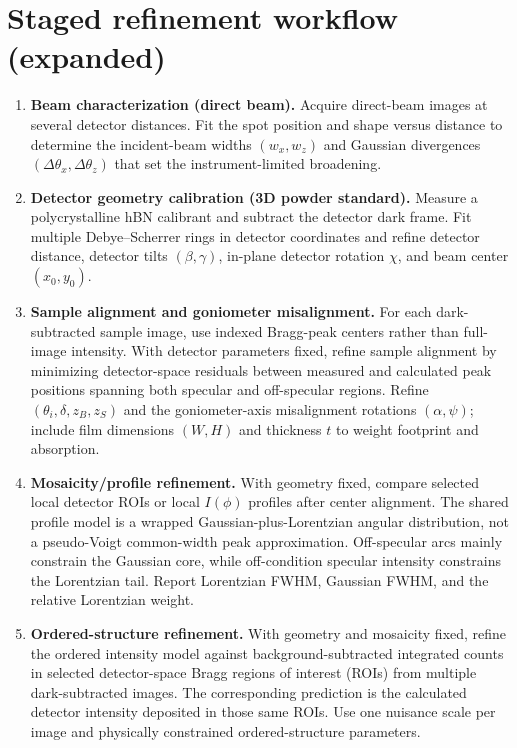 \documentclass[11pt]{article}
\begin{document}
\section{Staged refinement workflow (expanded)}
\label{sec:si_workflow}

\begin{enumerate}
  \item \textbf{Beam characterization (direct beam).}
  Acquire direct-beam images at several detector distances. Fit the spot position and shape versus distance to determine the incident-beam widths $(w_x,w_z)$ and Gaussian divergences $(\Delta\theta_x,\Delta\theta_z)$ that set the instrument-limited broadening.

  \item \textbf{Detector geometry calibration (3D powder standard).}
  Measure a polycrystalline hBN calibrant and subtract the detector dark frame. Fit multiple Debye--Scherrer rings in detector coordinates and refine detector distance, detector tilts $(\beta,\gamma)$, in-plane detector rotation $\chi$, and beam center $(x_0,y_0)$.

  \item \textbf{Sample alignment and goniometer misalignment.}
  For each dark-subtracted sample image, use indexed Bragg-peak centers rather than full-image intensity. With detector parameters fixed, refine sample alignment by minimizing detector-space residuals between measured and calculated peak positions spanning both specular and off-specular regions. Refine $(\theta_i,\delta,z_B,z_S)$ and the goniometer-axis misalignment rotations $(\alpha,\psi)$; include film dimensions $(W,H)$ and thickness $t$ to weight footprint and absorption.

  \item \textbf{Mosaicity/profile refinement.}
  With geometry fixed, compare selected local detector ROIs or local $I(\phi)$ profiles after center alignment. The shared profile model is a wrapped Gaussian-plus-Lorentzian angular distribution, not a pseudo-Voigt common-width peak approximation. Off-specular arcs mainly constrain the Gaussian core, while off-condition specular intensity constrains the Lorentzian tail. Report Lorentzian FWHM, Gaussian FWHM, and the relative Lorentzian weight.

  \item \textbf{Ordered-structure refinement.}
  With geometry and mosaicity fixed, refine the ordered intensity model against background-subtracted integrated counts in selected detector-space Bragg regions of interest (ROIs) from multiple dark-subtracted images. The corresponding prediction is the calculated detector intensity deposited in those same ROIs. Use one nuisance scale per image and physically constrained ordered-structure parameters.


\end{enumerate}
\end{document}
